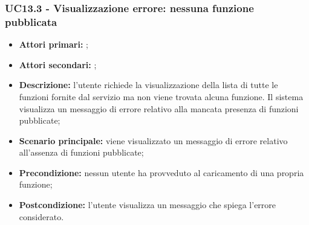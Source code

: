 \subsubsection{UC13.3 - Visualizzazione errore: nessuna funzione pubblicata}
\begin{itemize}
	\item \textbf{Attori primari:} \ua{};
	\item \textbf{Attori secondari:} \re{};
	\item \textbf{Descrizione:} l’utente richiede la visualizzazione della lista di tutte le funzioni fornite dal servizio ma non viene trovata alcuna funzione. Il sistema visualizza un messaggio di errore relativo alla mancata presenza di funzioni pubblicate; 
	\item \textbf{Scenario principale:} viene visualizzato un messaggio di errore relativo all’assenza di funzioni pubblicate;
	\item \textbf{Precondizione:} nessun utente ha provveduto al caricamento di una propria funzione;
	\item \textbf{Postcondizione:}  l’utente visualizza un messaggio che spiega l’errore considerato.
\end{itemize}